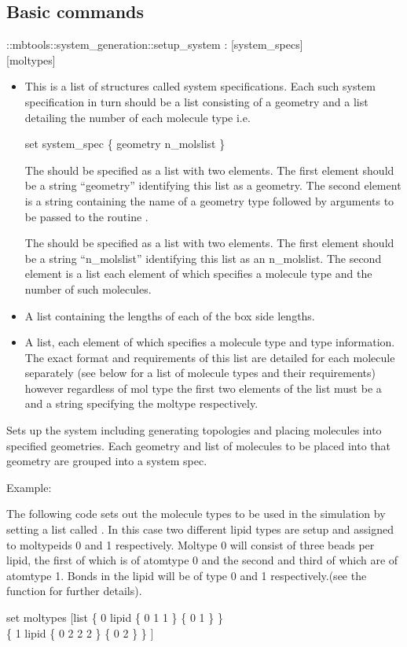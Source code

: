 \subsection{Basic commands}
\begin{code}
  ::mbtools::system_generation::setup_system  :  [system_specs]\\ 
             [iboxl] [moltypes]
\end{code}
\begin{itemize}
\item {} This is a list of structures called system specifications. Each such system specification in turn should be a list consisting of a geometry and a list detailing the number of each molecule type i.e.
\begin{code}
  set system\_spec \{ geometry n\_molslist \}
\end{code}
  The  should be specified as a list with two elements. The first element should be a string ``geometry'' identifying this list as a geometry. The second element is a string containing the name of a geometry type  followed by arguments to be passed to the routine .
  
  The  should be specified as a list with two elements. The first element should be a string ``n_molslist'' identifying this list as an n_molslist. The second element is a list each element of which specifies a molecule type and the number of such molecules.
\item {} A list containing the lengths of each of the box side lengths.
\item {} A list, each element of which specifies a molecule type and type information. The exact format and requirements of this list are detailed for each molecule separately (see below for a list of molecule types and their requirements) however regardless of mol type the first two elements of the list must be a  and a string specifying the moltype respectively.
\end{itemize}   

   Sets up the system including generating topologies and placing molecules into specified geometries. Each geometry and list of molecules to be placed into that geometry are grouped into a system spec.

      Example:

      The following code sets out the molecule types to be used in the simulation by setting a list called . In this case two different lipid types are setup and assigned to moltypeids 0 and 1 respectively. Moltype 0 will consist of three beads per lipid, the first of which is of atomtype 0 and the second and third of which are of atomtype 1. Bonds in the lipid will be of type 0 and 1 respectively.(see the  function for further details).
\begin{code}      	   
  set moltypes [list \{ 0 lipid \{ 0 1 1 \} \{ 0 1 \} \} \\
                     \{ 1 lipid \{ 0 2 2 2 \} \{ 0 2 \} \} ]
\end{code}
      	     	
